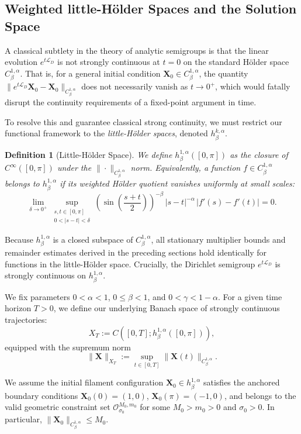 \documentclass{amsart}
\newtheorem{definition}[theorem]{Definition}
\begin{document}
\subsection{Weighted little-Hölder Spaces and the Solution Space}

A classical subtlety in the theory of analytic semigroups is that the linear evolution $e^{t\mathcal{L}_D}$ is not strongly continuous at $t=0$ on the standard Hölder space $C^{1,\alpha}_\beta$. That is, for a general initial condition $\mathbf{X}_0 \in C^{1,\alpha}_\beta$, the quantity $\|e^{t\mathcal{L}_D}\mathbf{X}_0 - \mathbf{X}_0\|_{C^{1,\alpha}_\beta}$ does not necessarily vanish as $t \to 0^+$, which would fatally disrupt the continuity requirements of a fixed-point argument in time.

To resolve this and guarantee classical strong continuity, we must restrict our functional framework to the \emph{little-Hölder spaces}, denoted $h^{k,\alpha}_\beta$. 

\begin{definition}[Little-Hölder Space]
We define $h^{1,\alpha}_\beta([0,\pi])$ as the closure of $C^\infty([0,\pi])$ under the $\|\cdot\|_{C^{1,\alpha}_\beta}$ norm. Equivalently, a function $f \in C^{1,\alpha}_\beta$ belongs to $h^{1,\alpha}_\beta$ if its weighted Hölder quotient vanishes uniformly at small scales:
\[
\lim_{\delta \to 0^+} \sup_{\substack{s,t\in[0,\pi]\\ 0 < |s-t| < \delta}}
\left(\sin\left(\frac{s+t}{2}\right)\right)^{-\beta}\,|s-t|^{-\alpha}\,|f'(s)-f'(t)| = 0.
\]
\end{definition}

Because $h^{1,\alpha}_\beta$ is a closed subspace of $C^{1,\alpha}_\beta$, all stationary multiplier bounds and remainder estimates derived in the preceding sections hold identically for functions in the little-Hölder space. Crucially, the Dirichlet semigroup $e^{t\mathcal{L}_D}$ is strongly continuous on $h^{1,\alpha}_\beta$.

We fix parameters $0 < \alpha < 1$, $0 \le \beta < 1$, and $0 < \gamma < 1-\alpha$. For a given time horizon $T > 0$, we define our underlying Banach space of strongly continuous trajectories:
\[
X_T := C([0,T]; h^{1,\alpha}_\beta([0,\pi])),
\]
equipped with the supremum norm
\[
\|\mathbf{X}\|_{X_T} := \sup_{t \in [0,T]} \|\mathbf{X}(t)\|_{C^{1,\alpha}_\beta}.
\]

We assume the initial filament configuration $\mathbf{X}_0 \in h^{1,\alpha}_\beta$ satisfies the anchored boundary conditions $\mathbf{X}_0(0) = (1,0)$, $\mathbf{X}_0(\pi) = (-1,0)$, and belongs to the valid geometric constraint set $\mathcal{O}^{M_0, m_0}_{\sigma_0}$ for some $M_0 > m_0 > 0$ and $\sigma_0 > 0$. In particular, $\|\mathbf{X}_0\|_{C^{1,\alpha}_\beta} \le M_0$.
\end{document}
